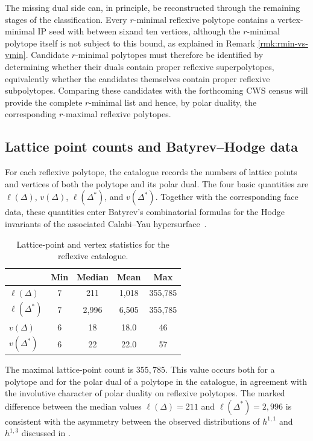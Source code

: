 \documentclass[appliedmath,article,submit,moreauthors]{Definitions/mdpi}
\begin{document}
The missing dual side can, in principle, be reconstructed through the remaining
stages of the classification. Every \(r\)-minimal reflexive polytope contains a
vertex-minimal IP seed with between sixand ten vertices, although the
\(r\)-minimal polytope itself is not subject to this bound, as explained in
Remark \ref{rmk:rmin-vs-vmin}. Candidate \(r\)-minimal polytopes must therefore be
identified by determining whether their duals contain proper reflexive
superpolytopes, equivalently whether the candidates themselves contain proper
reflexive subpolytopes. Comparing these candidates with the forthcoming CWS
census will provide the complete \(r\)-minimal list and hence, by polar duality,
the corresponding \(r\)-maximal reflexive polytopes.

\subsection{Lattice point counts and Batyrev--Hodge data}
\label{sec:results-lattice}

For each reflexive polytope, the catalogue records the numbers of lattice points
and vertices of both the polytope and its polar dual. The four basic quantities
are \(\ell(\Delta)\), \(v(\Delta)\), \(\ell(\Delta^*)\), and \(v(\Delta^*)\).
Together with the corresponding face data, these quantities enter Batyrev's
combinatorial formulas for the Hodge invariants of the associated Calabi--Yau
hypersurface~\cite{Batyrev1994,BatyrevBorisov1996}.

\begin{table}[H]
\caption{Lattice-point and vertex statistics for the reflexive
catalogue.\label{tab:lattice-stats}}
\begin{tabularx}{\textwidth}{lCCCC}
\toprule
 & \textbf{Min} & \textbf{Median} & \textbf{Mean} & \textbf{Max} \\
\midrule
\(\ell(\Delta)\)   & 7 & 211   & 1{,}018 & 355{,}785 \\
\(\ell(\Delta^*)\) & 7 & 2{,}996 & 6{,}505 & 355{,}785 \\
\(v(\Delta)\)      & 6 & 18    & 18.0    & 46 \\
\(v(\Delta^*)\)    & 6 & 22    & 22.0    & 57 \\
\bottomrule
\end{tabularx}
\end{table}

The maximal lattice-point count is \(355{,}785\). This value occurs both for a
polytope and for the polar dual of a polytope in the catalogue, in agreement
with the involutive character of polar duality on reflexive polytopes. The
marked difference between the median values \(\ell(\Delta)=211\) and
\(\ell(\Delta^*)=2{,}996\) is consistent with the asymmetry between the observed
distributions of \(h^{1,1}\) and \(h^{1,3}\) discussed in
.
\end{document}

